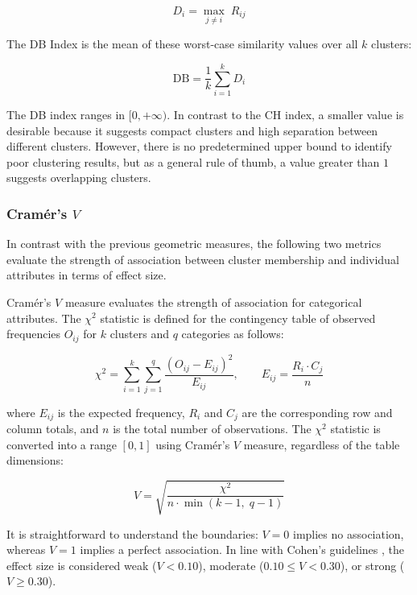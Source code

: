 \begin{equation}
    D_i = \max_{j \neq i}\; R_{ij}
    \label{eq:db_Di}
\end{equation}

The DB Index is the mean of these worst-case similarity values over all $k$ clusters:

\begin{equation}
    \mathrm{DB} = \frac{1}{k} \sum_{i=1}^{k} D_i
    \label{eq:db}
\end{equation}

\clearpage

The DB index ranges in $[0, +\infty)$. In contrast to the CH index, a smaller value is desirable because it suggests compact clusters and high separation between different clusters. However, there is no predetermined upper bound to identify poor clustering results, but as a general rule of thumb, a value greater than $1$ suggests overlapping clusters.

\subsubsection*{Cramér's $V$}

In contrast with the previous geometric measures, the following two metrics evaluate the strength of association between cluster membership and individual attributes in terms of effect size.

Cramér’s $V$ measure \cite{cramer1946} evaluates the strength of association for categorical attributes. The $\chi^2$ statistic is defined for the contingency table of observed frequencies $O_{ij}$ for $k$ clusters and $q$ categories as follows:

\begin{equation}
    \chi^2 = \sum_{i=1}^{k} \sum_{j=1}^{q} \frac{(O_{ij} - E_{ij})^2}{E_{ij}}, \qquad E_{ij} = \frac{R_i \cdot C_j}{n}
    \label{eq:chisq}
\end{equation}

where $E_{ij}$ is the expected frequency, $R_i$ and $C_j$ are the corresponding row and column totals, and $n$ is the total number of observations. The $\chi^2$ statistic is converted into a range $[0, 1]$ using Cramér’s $V$ measure, regardless of the table dimensions:

\begin{equation}
    V = \sqrt{\frac{\chi^2}{n \cdot \min(k-1,\; q-1)}}
    \label{eq:cramer_v}
\end{equation}

It is straightforward to understand the boundaries: $V=0$ implies no association, whereas $V=1$ implies a perfect association. In line with Cohen's guidelines \cite{cohen1988}, the effect size is considered weak ($V<0.10$), moderate ($0.10 \leq V<0.30$), or strong ($V \geq 0.30$).

